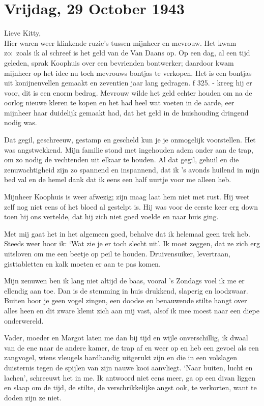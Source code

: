 \documentclass{book}
\begin{document}
\section*{Vrijdag, 29 October 1943}

Lieve Kitty,\\
Hier waren weer klinkende ruzie's tussen mijnheer en mevrouw. Het
kwam zo:~zoals ik al schreef is het geld van de Van Daans op. Op een dag, al een
tijd geleden, sprak Koophuis over een bevrienden bontwerker; daardoor kwam
mijnheer op het idee nu toch mevrouws bontjas te verkopen. Het is een bontjas
uit konijnenvellen gemaakt en zeventien jaar lang gedragen. ƒ 325. - kreeg hij
er voor, dit is een enorm bedrag.  Mevrouw wilde het geld echter houden om na de
oorlog nieuwe kleren te kopen en het had heel wat voeten in de aarde, eer
mijnheer haar duidelijk gemaakt had, dat het geld in de huishouding dringend
nodig was.

Dat gegil, geschreeuw, gestamp en gescheld kun je je onmogelijk voorstellen. Het
was angstwekkend. Mijn familie stond met ingehouden adem onder aan de trap, om
zo nodig de vechtenden uit elkaar te houden.  Al dat gegil, gehuil en die
zenuwachtigheid zijn zo spannend en inspannend, dat ik 's avonds huilend in mijn
bed val en de hemel dank dat ik eens een half uurtje voor me alleen heb.

Mijnheer Koophuis is weer afwezig; zijn maag laat hem niet met rust. Hij weet
zelf nog niet eens of het bloed al gestelpt is. Hij was voor de eerste keer erg
down toen hij ons vertelde, dat hij zich niet goed voelde en naar huis ging.

Met mij gaat het in het algemeen goed, behalve dat ik helemaal geen trek heb.
Steeds weer hoor ik: `Wat zie je er toch slecht uit'. Ik moet zeggen, dat ze
zich erg uitsloven om me een beetje op peil te houden.  Druivensuiker,
levertraan, gisttabletten en kalk moeten er aan te pas komen.

Mijn zenuwen ben ik lang niet altijd de baas, vooral 's Zondags voel ik me er
ellendig aan toe. Dan is de stemming in huis drukkend, slaperig en loodzwaar.
Buiten hoor je geen vogel zingen, een doodse en benauwende stilte hangt over
alles heen en dit zware klemt zich aan mij vast, alsof ik mee moest naar een
diepe onderwereld.

Vader, moeder en Margot laten me dan bij tijd en wijle onverschillig, ik dwaal
van de ene naar de andere kamer, de trap af en weer op en heb een gevoel als een
zangvogel, wiens vleugels hardhandig uitgerukt zijn en die in een volslagen
duisternis tegen de spijlen van zijn nauwe kooi aanvliegt. `Naar buiten, lucht
en lachen', schreeuwt het in me. Ik antwoord niet eens meer, ga op een divan
liggen en slaap om de tijd, de stilte, de verschrikkelijke angst ook, te
verkorten, want te doden zijn ze niet.
\end{document}
